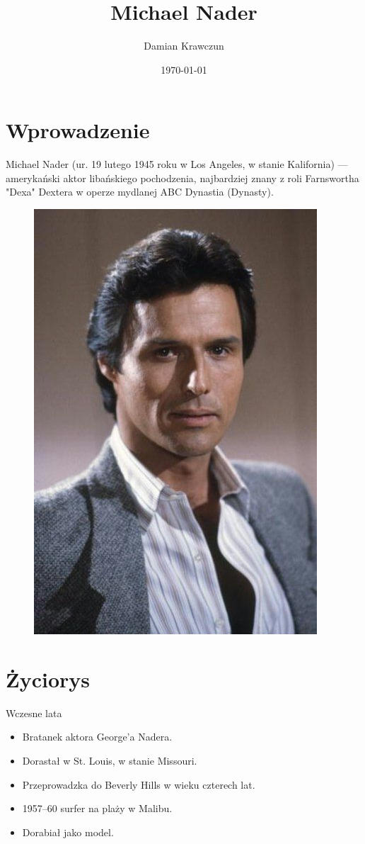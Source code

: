 \documentclass{beamer}
\title{Michael Nader}
\author{Damian Krawczun}
\institute{UWM}
\date{\today}
\begin{document}
\frame{\titlepage}
\section{Wprowadzenie}
\begin{frame}
Michael Nader (ur. 19 lutego 1945\cite{bio} roku w Los Angeles\cite{tvcom}, w stanie Kalifornia) --- amerykański aktor libańskiego pochodzenia, najbardziej znany z roli Farnswortha "Dexa" Dextera w operze mydlanej ABC Dynastia (Dynasty).
\begin{figure}[here]
\begin{center}
\includegraphics[scale=0.3]{nader.jpg}
\end{center}
\end{figure}
\end{frame}

\section{Życiorys}
\begin{frame}{Wczesne lata}
\begin{itemize}
\item Bratanek aktora George'a Nadera\cite{omni}.
\item Dorastał w St. Louis, w stanie Missouri.
\pause
\item Przeprowadzka do Beverly Hills w wieku czterech lat.
\item 1957--60 surfer na plaży w Malibu.
\item Dorabiał jako model.
\end{itemize}
\end{frame}
\end{document}
